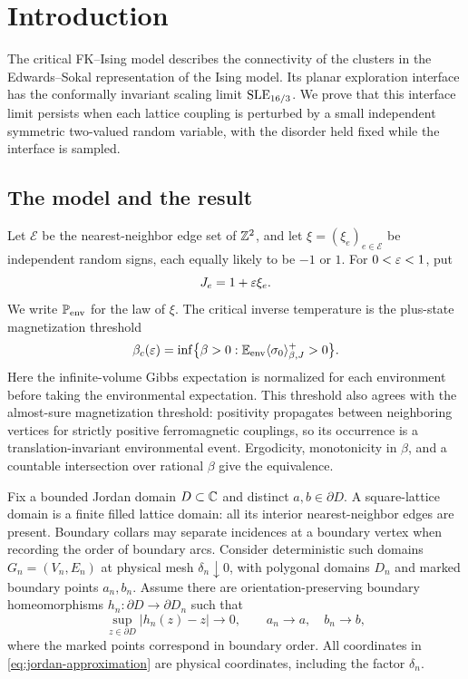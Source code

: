 \section{Introduction}\label{sec:introduction}

The critical FK--Ising model describes the connectivity of the clusters in the
Edwards--Sokal representation of the Ising model. Its planar exploration
interface has the conformally invariant scaling limit $\SLE_{16/3}$.
We prove that this interface limit persists when each lattice coupling is
perturbed by a small independent symmetric two-valued random variable, with
the disorder held fixed while the interface is sampled.

\subsection{The model and the result}

Let $\mathcal E$ be the nearest-neighbor edge set of $\Z^2$, and let
$\xi=(\xi_e)_{e\in\mathcal E}$ be independent random signs, each equally
likely to be $-1$ or $1$. For $0<\eps<1$, put
\begin{equation}\label{eq:random-couplings}
 J_e=1+\eps\xi_e.
\end{equation}
We write $\P_{\mathrm{env}}$ for the law of $\xi$. The critical inverse
temperature is the plus-state magnetization threshold
\[
 \beta_c(\eps)=\inf\bigl\{\beta>0:
       \E_{\mathrm{env}}\langle\sigma_0\rangle^+_{\beta,J}>0\bigr\}.
\]
Here the infinite-volume Gibbs expectation is normalized for each environment
before taking the environmental expectation. This threshold also agrees with
the almost-sure magnetization threshold: positivity propagates between
neighboring vertices for strictly positive ferromagnetic couplings, so its
occurrence is a translation-invariant environmental event. Ergodicity,
monotonicity in $\beta$, and a countable intersection over rational $\beta$
give the equivalence.

Fix a bounded Jordan domain $D\subset\C$ and distinct $a,b\in\partial D$.
A square-lattice domain is a finite filled lattice domain: all its interior
nearest-neighbor edges are present. Boundary collars may separate incidences
at a boundary vertex when recording the order of boundary arcs. Consider
deterministic such domains $G_n=(V_n,E_n)$ at physical mesh $\delta_n\downarrow0$,
with polygonal domains $D_n$ and marked boundary points $a_n,b_n$.
Assume there are orientation-preserving boundary homeomorphisms
$h_n:\partial D\to\partial D_n$ such that
\begin{equation}\label{eq:jordan-approximation}
 \sup_{z\in\partial D}|h_n(z)-z|\longrightarrow0,
 \qquad a_n\longrightarrow a,\quad b_n\longrightarrow b,
\end{equation}
where the marked points correspond in boundary order. All coordinates in
\eqref{eq:jordan-approximation} are physical coordinates, including the
factor $\delta_n$.

